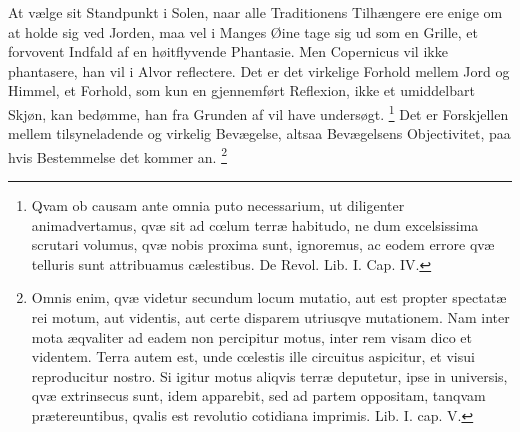 \documentclass[12pt,a4paper]{book}
\renewcommand{\thefootnote}{*)}
\begin{document}
At vælge sit Standpunkt i Solen, naar alle Traditionens Tilhængere ere
enige om at holde sig ved Jorden, maa vel i Manges Øine tage sig ud som
en Grille, et forvovent Indfald af en høitflyvende Phantasie. Men
Copernicus vil ikke phantasere, han vil i Alvor reflectere. Det er det
virkelige Forhold mellem Jord og Himmel, et Forhold, som kun en
gjennemført Reflexion, ikke et umiddelbart Skjøn, kan bedømme, han fra
Grunden af vil have undersøgt.%
\renewcommand{\thefootnote}{**)}%
\footnote{%
Qvam ob causam ante omnia puto necessarium, ut diligenter
animadvertamus, qvæ sit ad cœlum terræ habitudo, ne dum excelsissima
scrutari volumus, qvæ nobis proxima sunt, ignoremus, ac eodem errore
qvæ telluris sunt attribuamus cælestibus. De Revol. Lib. I. Cap. IV.}%
\renewcommand{\thefootnote}{*)}
Det er Forskjellen mellem tilsyneladende og virkelig Bevægelse, altsaa
Bevægelsens Objectivitet, paa hvis Bestemmelse det kommer an.%
\renewcommand{\thefootnote}{***)}%
\footnote{%
Omnis enim, qvæ videtur secundum locum mutatio, aut est propter
spectatæ rei motum, aut videntis, aut certe disparem utriusqve
mutationem. Nam inter mota æqvaliter ad eadem non percipitur motus,
inter rem visam dico et videntem. Terra autem est, unde cœlestis ille
circuitus aspicitur, et visui reproducitur nostro. Si igitur motus
aliqvis terræ deputetur, ipse in universis, qvæ extrinsecus sunt, idem
apparebit, sed ad partem oppositam, tanqvam prætereuntibus, qvalis est
revolutio cotidiana imprimis. Lib. I. cap. V.}%
\renewcommand{\thefootnote}{*)}
\end{document}
